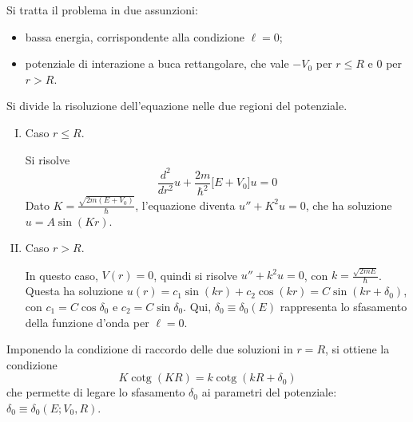 \documentclass[11pt, a4paper]{scrartcl}
\theoremstyle{style}
\numberwithin{equation}{subsection}
\begin{document}
Si tratta il problema in due assunzioni:
\begin{itemize}
	\item bassa energia, corrispondente alla condizione $\ell =0$;
	\item potenziale di interazione a buca rettangolare, che vale $-V_0$ per $r\le R$ e $0$ per $r>R$.
\end{itemize}
Si divide la risoluzione dell'equazione nelle due regioni del potenziale.
\begin{enumerate}[(I).]
	\item Caso $r\le R$.

		Si risolve 
		\[
		\frac{d ^2}{d r^2}  u + \frac{2m}{\hbar ^2} \big[ E + V_0 \big]  u = 0
		\] 
		Dato $K = \frac{\sqrt{2m (E+V_0)} }{\hbar }$, l'equazione diventa $u'' + K^2 u = 0$, che ha soluzione $u = A \sin(Kr)$.
	\item Caso $r > R$.

		In questo caso, $V(r) = 0$, quindi si risolve $u'' + k^2 u = 0$, con $k = \frac{\sqrt{2mE} }{\hbar }$.
		Questa ha soluzione $u(r) =c_1\sin(kr) + c_2 \cos(kr)= C \sin (kr + \delta _0)$, con $c_1 = C \cos \delta _0$ e $c_2 = C \sin \delta _0$.
Qui, $\delta _0 \equiv \delta _0 (E)$ rappresenta lo sfasamento della funzione d'onda per $\ell =0$.
\end{enumerate}
Imponendo la condizione di raccordo delle due soluzioni in $r=R$, si ottiene la condizione
\[
K \operatorname{cotg} (KR) = k \operatorname{cotg} (kR + \delta _0)
\] 
che permette di legare lo sfasamento $\delta _0$ ai parametri del potenziale: $\delta _0\equiv \delta _0 (E; V_0,R)$.
\end{document}
